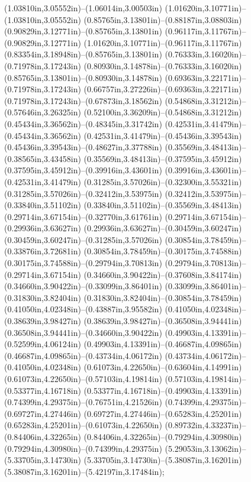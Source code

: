 (1.03810in,3.05552in)--(1.06014in,3.00503in) (1.01620in,3.10771in)--(1.03810in,3.05552in) (0.85765in,3.13801in)--(0.88187in,3.08803in) (0.90829in,3.12771in)--(0.85765in,3.13801in) (0.96117in,3.11767in)--(0.90829in,3.12771in) (1.01620in,3.10771in)--(0.96117in,3.11767in) (0.83354in,3.18948in)--(0.85765in,3.13801in) (0.76333in,3.16020in)--(0.71978in,3.17243in) (0.80930in,3.14878in)--(0.76333in,3.16020in) (0.85765in,3.13801in)--(0.80930in,3.14878in) (0.69363in,3.22171in)--(0.71978in,3.17243in) (0.66757in,3.27226in)--(0.69363in,3.22171in) (0.71978in,3.17243in)--(0.67873in,3.18562in) (0.54868in,3.31212in)--(0.57646in,3.26325in) (0.52100in,3.36209in)--(0.54868in,3.31212in) (0.45434in,3.36562in)--(0.48345in,3.31742in) (0.42531in,3.41479in)--(0.45434in,3.36562in) (0.42531in,3.41479in)--(0.45436in,3.39543in) (0.45436in,3.39543in)--(0.48627in,3.37788in) (0.35569in,3.48413in)--(0.38565in,3.43458in) (0.35569in,3.48413in)--(0.37595in,3.45912in) (0.37595in,3.45912in)--(0.39916in,3.43601in) (0.39916in,3.43601in)--(0.42531in,3.41479in) (0.31285in,3.57026in)--(0.32300in,3.55321in) (0.31285in,3.57026in)--(0.32412in,3.53975in) (0.32412in,3.53975in)--(0.33840in,3.51102in) (0.33840in,3.51102in)--(0.35569in,3.48413in) (0.29714in,3.67154in)--(0.32770in,3.61761in) (0.29714in,3.67154in)--(0.29936in,3.63627in) (0.29936in,3.63627in)--(0.30459in,3.60247in) (0.30459in,3.60247in)--(0.31285in,3.57026in) (0.30854in,3.78459in)--(0.33876in,3.72681in) (0.30854in,3.78459in)--(0.30175in,3.74588in) (0.30175in,3.74588in)--(0.29794in,3.70813in) (0.29794in,3.70813in)--(0.29714in,3.67154in) (0.34660in,3.90422in)--(0.37608in,3.84174in) (0.34660in,3.90422in)--(0.33099in,3.86401in) (0.33099in,3.86401in)--(0.31830in,3.82404in) (0.31830in,3.82404in)--(0.30854in,3.78459in) (0.41050in,4.02348in)--(0.43887in,3.95582in) (0.41050in,4.02348in)--(0.38639in,3.98427in) (0.38639in,3.98427in)--(0.36508in,3.94441in) (0.36508in,3.94441in)--(0.34660in,3.90422in) (0.49903in,4.13391in)--(0.52599in,4.06124in) (0.49903in,4.13391in)--(0.46687in,4.09865in) (0.46687in,4.09865in)--(0.43734in,4.06172in) (0.43734in,4.06172in)--(0.41050in,4.02348in) (0.61073in,4.22650in)--(0.63604in,4.14991in) (0.61073in,4.22650in)--(0.57103in,4.19814in) (0.57103in,4.19814in)--(0.53377in,4.16718in) (0.53377in,4.16718in)--(0.49903in,4.13391in) (0.74399in,4.29375in)--(0.76751in,4.21526in) (0.74399in,4.29375in)--(0.69727in,4.27446in) (0.69727in,4.27446in)--(0.65283in,4.25201in) (0.65283in,4.25201in)--(0.61073in,4.22650in) (0.89732in,4.33237in)--(0.84406in,4.32265in) (0.84406in,4.32265in)--(0.79294in,4.30980in) (0.79294in,4.30980in)--(0.74399in,4.29375in) (5.29053in,3.13062in)--(5.33705in,3.14730in) (5.33705in,3.14730in)--(5.38087in,3.16201in) (5.38087in,3.16201in)--(5.42197in,3.17484in);
